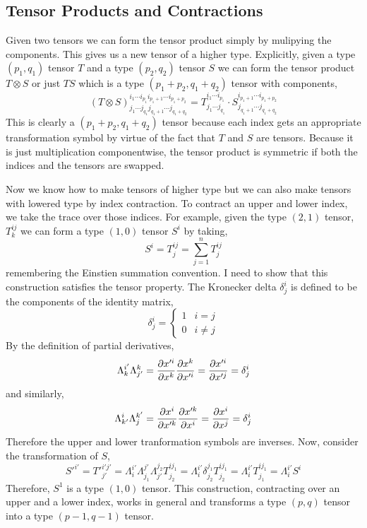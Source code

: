 \documentclass[11pt, a4paper]{article}
\begin{document}
\subsection{Tensor Products and Contractions}
Given two tensors we can form the tensor product simply by mulipying the components. This gives us a new tensor of a higher type. Explicitly, given a type $(p_1, q_1)$ tensor $T$ and a type $(p_2, q_2)$ tensor $S$ we can form the tensor product $T \otimes S$ or just $TS$ which is a type $(p_1 + p_2, q_1 + q_2)$ tensor with components,
\[ (T \otimes S)^{i_1 \cdots i_{p_1}  i_{p_1 + 1} \cdots i_{p_1 + p_2}}_{j_1 \cdots j_{q_1}  j_{q_1 + 1} \cdots j_{q_1 + q_2}} = T^{i_1 \cdots i_{p_1}}_{j_1 \cdots j_{q_1}} \cdot S^{i_{p_1 + 1} \cdots i_{p_1 + p_2}}_{j_{q_1 + 1} \cdots j_{q_1 + q_2}} \]
This is clearly a $(p_1 + p_2, q_1 + q_2)$ tensor because each index gets an appropriate transformation symbol by virtue of the fact that $T$ and $S$ are tensors. Because it is just multiplication componentwise, the tensor product is symmetric if both the indices and the tensors are swapped.  
\par
Now we know how to make tensors of higher type but we can also make tensors with lowered type by index contraction. To contract an upper and lower index, we take the trace over those indices. For example, given the type $(2,1)$ tensor, $T^{ij}_{k}$ we can form a type $(1,0)$ tensor $S^i$ by taking,
\[S^i = T^{ij}_{j} = \sum_{j = 1}^n T^{ij}_j \]
remembering the Einstien summation convention. I need to show that this construction satisfies the tensor property. The Kronecker delta $\delta^i_j$ is defined to be the components of the identity matrix,
\[ \delta^i_j = 
\begin{cases}
1 & i = j\\
0 & i \neq j
\end{cases}\]
By the definition of partial derivatives,
\[ \Lambda^{i'}_k \Lambda^{k}_{j'} = \frac{\partial{x'^i}}{\partial{x^k}} \frac{\partial{x^k}}{\partial{x'^i}} = \frac{\partial{x'^i}}{\partial{x'^j}} = \delta^i_j \]
and similarly,
\[ \Lambda^{i}_{k'} \Lambda^{k'}_{j}=  \frac{\partial{x^i}}{\partial{x'^k}} \frac{\partial{x'^k}}{\partial{x^i}}  = \frac{\partial{x^i}}{\partial{x^j}} = \delta^i_j \]
Therefore the upper and lower tranformation symbols are inverses. Now, consider the transformation of $S$,
\[S'^{i'} = T'^{i'j'}_{j'} = \Lambda^{i'}_{i} \Lambda^{j'}_{j_1} \Lambda^{j_2}_{j'} T^{ij_1}_{j_2} = \Lambda^{i'}_{i} \delta^{j_1}_{j_2} T^{ij_1}_{j_2} = \Lambda^{i'}_{i} T^{ij_1}_{j_1} = \Lambda^{i'}_{i} S^{i} \]
Therefore, $S^1$ is a type $(1, 0)$ tensor. This construction, contracting over an upper and a lower index, works in general and transforms a type $(p, q)$ tensor into a type $(p-1, q-1)$ tensor. 
\end{document}
